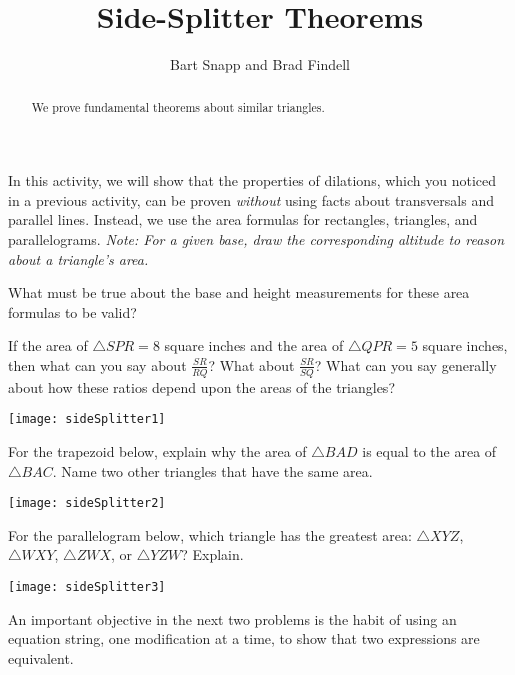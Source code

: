 \documentclass[nooutcomes]{ximera}
\title{Side-Splitter Theorems}
\author{Bart Snapp and Brad Findell}
\begin{document}
\begin{abstract}
  We prove fundamental theorems about similar triangles.
\end{abstract}
\maketitle

In this activity, we will show that the properties of dilations, which you noticed in a previous activity, can be proven \emph{without} using facts about transversals and parallel lines.  Instead, we use the area formulas for rectangles, triangles, and 
parallelograms.  \emph{Note: For a given base, draw the corresponding altitude to reason about a triangle's area.}
\begin{question}
What must be true about the base and height measurements for these area formulas to be valid?
\vspace{1in}
\end{question}

\begin{problem}
If the area of $\triangle SPR = 8$ square inches and the area of $\triangle QPR = 5$ square inches, then what can you say about $\frac{SR}{RQ}$?  What about $\frac{SR}{SQ}$?  What can you say generally about how these ratios depend upon the areas of the triangles?  
\begin{image}
\texttt{[image: sideSplitter1]}
\end{image}
\vfill
\end{problem}

\newpage
\begin{problem}
For the trapezoid below, explain why the area of $\triangle BAD$ is equal to the area of $\triangle BAC$.  Name two other triangles that have the same area.
\begin{image}
\texttt{[image: sideSplitter2]}
\end{image}
\vfill
\end{problem}

\begin{problem}
For the parallelogram below, which triangle has the greatest area: $\triangle XYZ$, $\triangle WXY$, $\triangle ZWX$, or $\triangle YZW$?  Explain.  
\begin{image}
\texttt{[image: sideSplitter3]}
\end{image}
\vfill
\end{problem}

\newpage
\begin{teachingnote}
An important objective in the next two problems is the habit of using an equation string, one modification at a time, to show that two expressions are equivalent.
\end{teachingnote}
\end{document}
